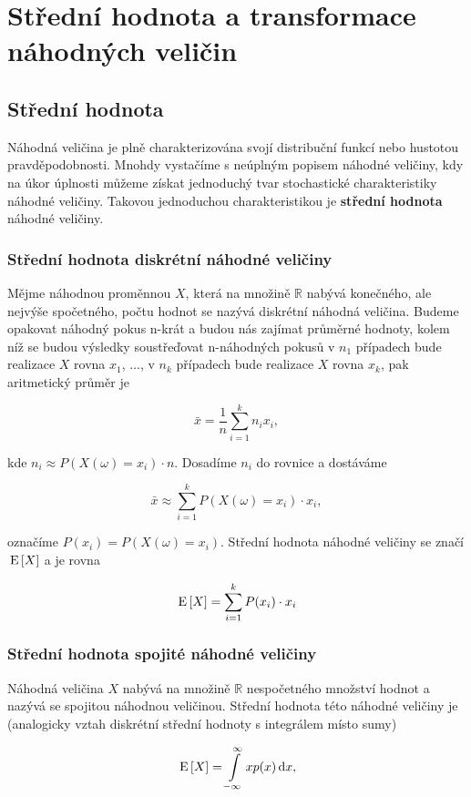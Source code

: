 \chapter{Střední hodnota a transformace náhodných veličin}

\section{Střední hodnota}
Náhodná veličina je plně charakterizována svojí distribuční funkcí nebo hustotou pravděpodobnosti. Mnohdy vystačíme s neúplným popisem náhodné veličiny, kdy na úkor úplnosti můžeme získat jednoduchý tvar stochastické charakteristiky náhodné veličiny. Takovou jednoduchou charakteristikou je \textbf{střední hodnota} náhodné veličiny.

\subsection{Střední hodnota diskrétní náhodné veličiny}
Mějme náhodnou proměnnou $X$, která na množině $\mathbb{R}$ nabývá konečného, ale nejvýše spočetného, počtu hodnot se nazývá diskrétní náhodná veličina. Budeme opakovat náhodný pokus n-krát a budou nás zajímat průměrné hodnoty, kolem níž se budou výsledky soustřeďovat n-náhodných pokusů v $n_1$ případech bude realizace $X$ rovna $x_1$, $\ldots$, v $n_k$ případech bude realizace $X$ rovna $x_k$, pak aritmetický průměr je

\[ \bar{x}=\frac{1}{n}\sum_{i=1}^k n_ix_i, \]

kde $n_i\approx P(X(\omega)=x_i)\cdot n$. Dosadíme $n_i$ do rovnice a dostáváme

\[ \bar{x}\approx \sum_{i=1}^k P(X(\omega)=x_i)\cdot x_i, \]

označíme $P(x_i)=P(X(\omega)=x_i)$. Střední hodnota náhodné veličiny se značí $\,\mathrm{E}\left[X\right]$ a je rovna

\[ \,\mathrm{E}\left[X\right] = \sum_{i=1}^k P(x_i)\cdot x_i \]

\subsection{Střední hodnota spojité náhodné veličiny}
Náhodná veličina $X$ nabývá na množině $\mathbb{R}$ nespočetného množství hodnot a nazývá se spojitou náhodnou veličinou. Střední hodnota této náhodné veličiny je (analogicky vztah diskrétní střední hodnoty s integrálem místo sumy)

\[ \,\mathrm{E}\left[X\right] = \int\limits_{-\infty}^\infty xp(x)\,\mathrm{d} x, \]

